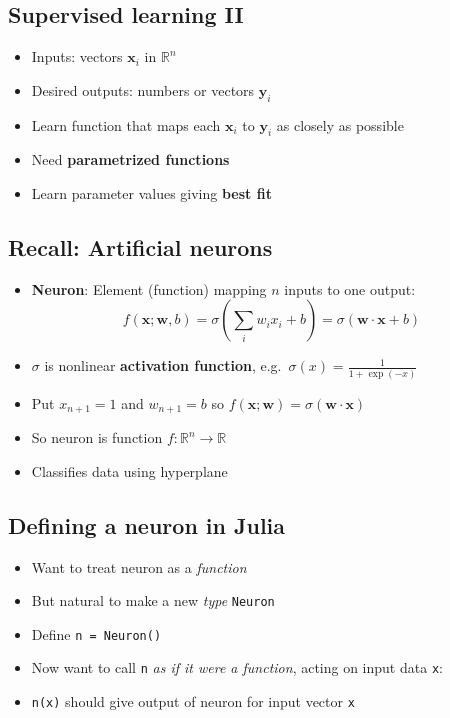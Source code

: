 \hypertarget{supervised-learning-ii}{%
\subsection{Supervised learning II}\label{supervised-learning-ii}}

\begin{itemize}
\item
  Inputs: vectors \(\mathbf{x}_i\) in \(\mathbb{R}^n\)
\item
  Desired outputs: numbers or vectors \(\mathbf{y}_i\)
\item
  Learn function that maps each \(\mathbf{x}_i\) to \(\mathbf{y}_i\) as
  closely as possible
\item
  Need \textbf{parametrized functions}
\item
  Learn parameter values giving \textbf{best fit}
\end{itemize}

\hypertarget{recall-artificial-neurons}{%
\subsection{Recall: Artificial
neurons}\label{recall-artificial-neurons}}

\begin{itemize}
\item
  \textbf{Neuron}: Element (function) mapping \(n\) inputs to one
  output:
  \[f(\mathbf{x}; \mathbf{w}, b) = \sigma \left( \sum_i w_i x_i + b \right)
        = \sigma(\mathbf{w} \cdot \mathbf{x} + b)
    \]
\item
  \(\sigma\) is nonlinear \textbf{activation function},
  e.g.~\(\sigma(x) = \frac{1}{1 + \exp(-x)}\)
\item
  Put \(x_{n+1} = 1\) and \(w_{n+1} = b\) so
  \(f(\mathbf{x}; \mathbf{w}) = \sigma (\mathbf{w} \cdot \mathbf{x})\)
\item
  So neuron is function \(f: \mathbb{R}^n \to \mathbb{R}\)
\item
  Classifies data using hyperplane
\end{itemize}

\hypertarget{defining-a-neuron-in-julia}{%
\subsection{Defining a neuron in
Julia}\label{defining-a-neuron-in-julia}}

\begin{itemize}
\item
  Want to treat neuron as a \emph{function}
\item
  But natural to make a new \emph{type} \texttt{Neuron}
\item
  Define \texttt{n\ =\ Neuron()}
\item
  Now want to call \texttt{n} \emph{as if it were a function}, acting on
  input data \texttt{x}:
\item
  \texttt{n(x)} should give output of neuron for input vector \texttt{x}
\end{itemize}

